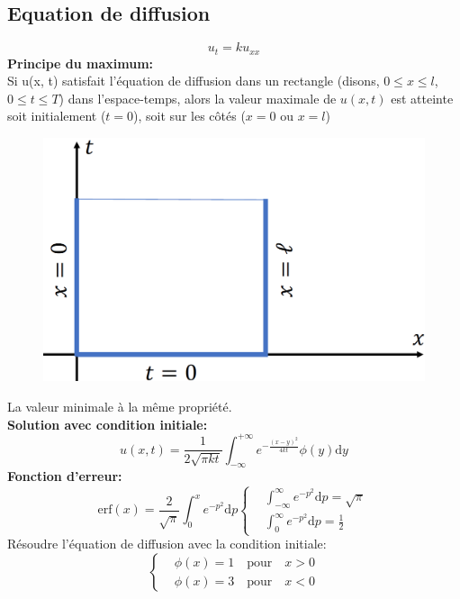 \subsection*{Equation de diffusion}
\begin{equation*}
    u_t=ku_{xx}
\end{equation*}
\textbf{Principe du maximum:}\\
Si u(x, t) satisfait l'équation de diffusion dans un rectangle
(disons, $0 \leq x \leq l$, $0 \leq t \leq T$) dans l'espace-temps, alors la valeur
maximale de $u(x, t)$ est atteinte soit initialement ($t = 0$), soit sur
les côtés ($x = 0$ ou $x = l$)
\begin{figure}[H]
    \centering
    \includegraphics[width=0.5\linewidth]{images/semaine3_principe_max.png}
\end{figure}
La valeur minimale à la même propriété.\\
\textbf{Solution avec condition initiale:}
\begin{equation*}
    \boxed{u(x,t)=\frac{1}{2\sqrt{\pi kt}}\int_{-\infty}^{+\infty}e^{-\frac{(x-y)^2}{4kt}}\phi(y)\mathrm{d}y}
\end{equation*}
\textbf{Fonction d'erreur:}
\begin{subequations}
    \begin{equation*}
        \text{erf}(x)=\frac{2}{\sqrt{\pi}}\int_0^xe^{-p^2}\mathrm{d}p
    \end{equation*}
    \begin{equation*}
        \left\{
        \begin{aligned}
             & \int_{-\infty}^{\infty}e^{-p^2}\mathrm{d}p=\sqrt{\pi} \\
             & \int_{0}^{\infty}e^{-p^2}\mathrm{d}p=\frac{1}{2}
        \end{aligned}
        \right.
    \end{equation*}
\end{subequations}
Résoudre l'équation de diffusion avec la condition initiale:
\begin{equation*}
    \left\{
    \begin{aligned}
         & \phi(x)=1\quad\text{pour}\quad x>0 \\
         & \phi(x)=3\quad\text{pour}\quad x<0
    \end{aligned}
    \right.
\end{equation*}
